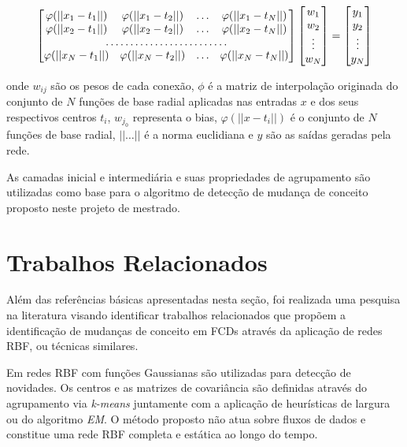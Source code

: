 \documentclass[qual, classic, a4paper]{ufbathesis}
\begin{document}
\begin{equation} \label{eq:rbf3}
\begin{bmatrix}
    \varphi (||{{x_1}}-{{t}}_{1}||) & \varphi (||{{x_1}}-{{t}}_{2}||) & \dots & \varphi (||{{x_1}}-{{t}}_{N}||) \\
    \varphi (||{{x_2}}-{{t}}_{1}||) & \varphi (||{{x_2}}-{{t}}_{2}||) & \dots & \varphi (||{{x_2}}-{{t}}_{N}||) \\
    \hdotsfor{5} \\
    \varphi (||{{x_N}}-{{t}}_{1}||) & \varphi (||{{x_N}}-{{t}}_{2}||) & \dots & \varphi (||{{x_N}}-{{t}}_{N}||)
\end{bmatrix}
\begin{bmatrix}
    w_1 \\
    w_2 \\
    \vdots \\
    w_N \\
\end{bmatrix}
=
\begin{bmatrix}
    y_1 \\
    y_2 \\
    \vdots \\
    y_N \\
\end{bmatrix}
\end{equation}

onde $w_{ij}$ são os pesos de cada conexão, $\phi$ é a matriz de interpolação originada do conjunto de $N$ funções
de base radial aplicadas nas entradas $x$ e dos seus respectivos centros $t_i$,
$w_{j_0}$ representa o bias, $\varphi (||{{x}}-{{t}}_{i}||)$ é o conjunto de $N$ funções de base radial,
$||\ldots||$ é a norma euclidiana e $y$ são as saídas geradas pela rede.

As camadas inicial e intermediária e suas propriedades de agrupamento são utilizadas como base para o algoritmo de detecção de mudança de conceito 
proposto neste projeto de mestrado. 

\section{Trabalhos Relacionados}

Além das referências básicas apresentadas nesta seção, foi realizada uma pesquisa na literatura visando identificar trabalhos relacionados 
que propõem a identificação de mudanças de conceito em FCDs através da aplicação de redes RBF, ou técnicas similares.

Em \cite{Jianping:Venkateswarlu:RBF:SpeakerIdentification} redes RBF com funções Gaussianas são utilizadas para detecção de novidades.
Os centros e as matrizes de covariância são definidas através do agrupamento via \textit{k-means} juntamente com a aplicação de heurísticas de largura ou do algoritmo \textit{EM}.
O método proposto não atua sobre fluxos de dados e constitue uma rede RBF completa e estática ao longo do tempo.
\end{document}
